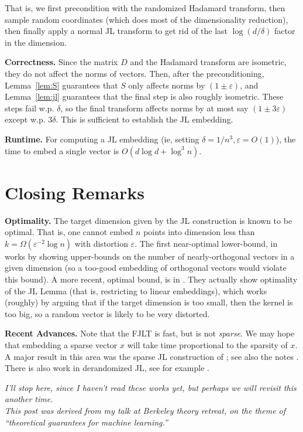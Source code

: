 \documentclass[]{article}
\newcommand{\1}{\mathbbm{1}}
\renewcommand{\epsilon}{\varepsilon}
\begin{document}
That is, we first precondition with the randomized Hadamard transform,
then sample random coordinates (which does most of the dimensionality reduction),
then finally apply a normal JL transform to get rid of the last $\log(d/\delta)$
factor in the dimension.

{\bf Correctness.} Since the matrix $D$ and the Hadamard transform are
isometric, they do not affect the norms of vectors.
Then, after the preconditioning,
Lemma~\ref{lem:S} guarantees that $S$ only affects norms by $(1 \pm
\epsilon)$, and Lemma~\ref{lem:jl} guarantees that the
final step is also roughly isometric. These steps fail w.p. $\delta$, so the
final transform affects norms by at most say $(1\pm 3\epsilon)$ except w.p.
$3\delta$.
This is sufficient to establish the JL embedding.

{\bf Runtime.}
For computing a JL embedding (ie, setting $\delta = 1/n^3, \epsilon=O(1)$),
the time to embed a single vector is
$O(d \log d + \log^3 n)$.

\section{Closing Remarks}

{\bf Optimality.}
The target dimension given by the JL construction is known to be optimal.
That is, one cannot embed $n$ points into dimension less than $k=\Omega(\epsilon^{-2}\log n)$
with distortion $\epsilon$.
The first near-optimal lower-bound, in \cite[Section 9]{alon}
works by showing upper-bounds on the number of nearly-orthogonal vectors in a
given dimension (so a too-good embedding of orthogonal vectors would violate this bound).
A more recent, optimal bound, is in \cite[Section 6]{kane}.
They actually show optimality of the JL Lemma (that is, restricting to linear
embeddings), which works (roughly) by arguing that if the target dimension is
too small, then the kernel is too big, so a random vector is likely to be very
distorted.

{\bf Recent Advances.}
Note that the FJLT is fast, but is not \emph{sparse}.
We may hope that embedding a sparse vector $x$ will take time proportional to
the sparsity of $x$. A major result in this area was
the sparse JL construction of \cite{sparseJL}; see also the notes \cite{jlnotes}.
There is also work in derandomized JL, see for example \cite{kane}.

{\it I'll stop here, since I haven't read these works yet, but
perhaps we will revisit this another time.\\
    This post was derived from my talk at Berkeley theory retreat,
    on the theme of ``theoretical guarantees for machine learning.''
}

{}

\end{document}
